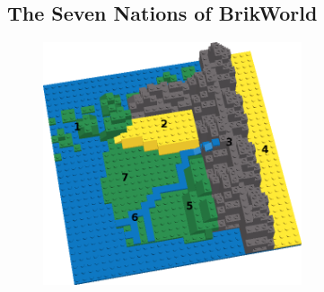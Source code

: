 \documentclass[12pt,a4paper,twocolumn]{article}
\begin{document}
\subsection{The Seven Nations of BrikWorld}

\begin{figure}[h]
\includegraphics[width=3in]{Numbered_BrikWorld.png}
\end{figure}
\end{document}
